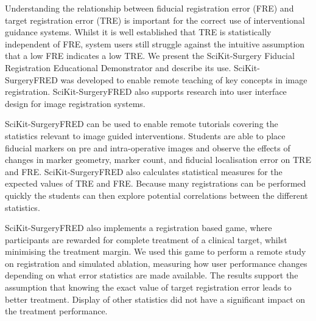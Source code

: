 Understanding the relationship between fiducial registration error (FRE) and target registration error (TRE) is important for the correct use of interventional guidance systems. Whilst it is well established that TRE is statistically independent of FRE, system users still struggle against the intuitive assumption that a low FRE indicates a low TRE. We present the SciKit-Surgery Fiducial Registration Educational Demonstrator and describe its use. SciKit-SurgeryFRED was developed to enable remote teaching of key concepts in image registration. SciKit-SurgeryFRED also supports research into user interface design for image registration systems. 

SciKit-SurgeryFRED can be used to enable remote tutorials covering the statistics relevant to image guided interventions. Students are able to place fiducial markers on pre and intra-operative images and observe the effects of changes in marker geometry, marker count, and fiducial localisation error on TRE and FRE. SciKit-SurgeryFRED also calculates statistical measures for the expected values of TRE and FRE. Because many registrations can be performed quickly the students can then explore potential correlations between the different statistics. 

SciKit-SurgeryFRED also implements a registration based game, where participants are rewarded for complete treatment of a clinical target, whilst minimising the treatment margin. We used this game to perform a remote study on registration and simulated ablation, measuring how user performance changes depending on what error statistics are made available. The results support the assumption that knowing the exact value of target registration error leads to better treatment. Display of other statistics did not have a significant impact on the treatment performance.  
